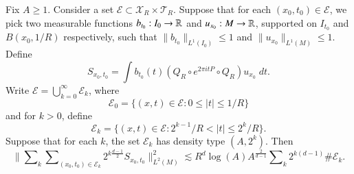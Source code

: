 \begin{prop} \label{L2DensityProposition}
    Fix $A \geq 1$. Consider a set $\mathcal{E} \subset \mathcal{X}_R \times \mathcal{T}_R$. Suppose that for each $(x_0,t_0) \in \mathcal{E}$, we pick two measurable functions $b_{t_0}: I_0 \to \operatorname{\mathbb{R}}$ and $u_{x_0}: M \to \operatorname{\mathbb{R}}$, supported on $I_{t_0}$ and $B(x_0,1/R)$ respectively, such that $\| b_{t_0} \|_{L^1(I_0)} \leq 1$ and $\| u_{x_0} \|_{L^1(M)} \leq 1$. Define 
    \begin{equation}
        {S\!}_{x_0,t_0} = \int b_{t_0}(t) (Q_R \circ e^{2 \pi i t P} \circ Q_R) u_{x_0}\; dt.
    \end{equation}
    Write $\mathcal{E} = \bigcup_{k = 0}^\infty \mathcal{E}_k$, where
    \begin{equation}
        \mathcal{E}_0 = \{ (x,t) \in \mathcal{E}: 0 \leq |t| \leq 1/R \}
    \end{equation}
    and for $k > 0$, define
    \begin{equation}
        \mathcal{E}_k = \{ (x,t) \in \mathcal{E}: 2^{k-1} / R < |t| \leq 2^k / R \}.
    \end{equation}
    Suppose that for each $k$, the set $\mathcal{E}_k$ has density type $(A,2^{k})$.
    Then
    \begin{equation} \label{DOIAWJDOIWAJDOIwdj21312321}
        \Big\| \sum\nolimits_k \sum\nolimits_{(x_0,t_0) \in \mathcal{E}_k} 2^{k \frac{d-1}{2}} {S\!}_{x_0,t_0} \Big\|_{L^2(M)}^2 \lesssim R^d \log(A) A^{\frac{2}{d-1}} \sum\nolimits_k 2^{k(d-1)} \# \mathcal{E}_k.
    \end{equation}
\end{prop}

